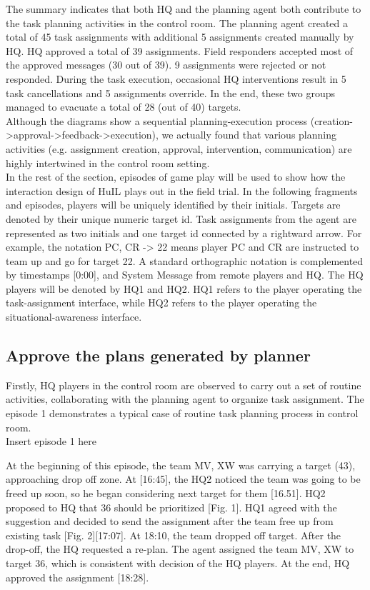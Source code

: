 The summary indicates that both HQ and the planning agent both contribute to the task planning activities in the control room. The planning agent created a total of 45 task assignments with additional 5 assignments created manually by HQ. HQ approved a total of 39 assignments. Field responders accepted most of the approved messages (30 out of 39). 9 assignments were rejected or not responded. During the task execution, occasional HQ interventions result in 5 task cancellations and 5 assignments override. In the end, these two groups managed to evacuate a total of 28 (out of 40) targets.\\ 

Although the diagrams show a sequential planning-execution process (creation->approval->feedback->execution), we actually found that various planning activities (e.g. assignment creation, approval, intervention, communication) are highly intertwined in the control room setting. \\

In the rest of the section, episodes of game play will be used to show how the interaction design of HuIL plays out in the field trial.  In the following fragments and episodes, players will be uniquely identified by their initials. Targets are denoted by their unique numeric target id. Task assignments from the agent are represented as two initials and one target id connected by a rightward arrow. For example, the notation PC, CR -> 22 means player PC and CR are instructed to team up and go for target 22. A standard orthographic notation is complemented by timestamps [0:00], and System Message from remote players and HQ. The HQ players will be denoted by HQ1 and HQ2. HQ1 refers to the player operating the task-assignment interface, while HQ2 refers to the player operating the situational-awareness interface.\\

\subsection{Approve the plans generated by planner}
Firstly, HQ players in the control room are observed to carry out a set of routine activities, collaborating with the planning agent to organize task assignment. The episode 1 demonstrates a typical case of routine task planning process in control room. \\

Insert episode 1 here

At the beginning of this episode, the team MV, XW was carrying a target (43), approaching drop off zone. At [16:45], the HQ2 noticed the team was going to be freed up soon, so he began considering next target for them [16.51]. HQ2 proposed to HQ that 36 should be prioritized [Fig. 1]. HQ1 agreed with the suggestion and decided to send the assignment after the team free up from existing task [Fig. 2][17:07]. At 18:10, the team dropped off target. After the drop-off, the HQ requested a re-plan. The agent assigned the team MV, XW to target 36, which is consistent with decision of the HQ players. At the end, HQ approved the assignment [18:28].\\

